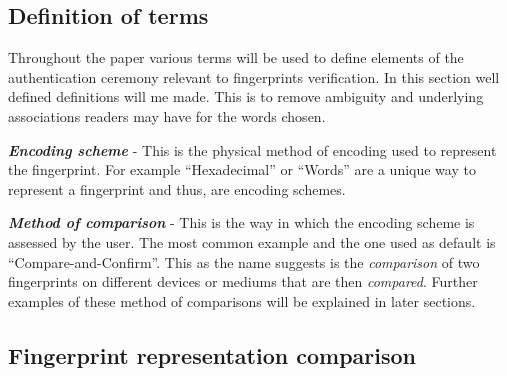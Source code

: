 \subsection*{Definition of terms}
Throughout the paper various terms will be used to define elements of the authentication ceremony relevant to fingerprints verification. In this section well defined definitions will me made. This is to remove ambiguity and underlying associations readers may have for the words chosen.

\textbf{\textit{Encoding scheme}} - This is the physical method of encoding used to represent the fingerprint. For example ``Hexadecimal'' or ``Words'' are a unique way to represent a fingerprint and thus, are encoding schemes.

\textbf{\textit{Method of comparison}} - This is the way in which the encoding scheme is assessed by the user. The most common example and the one used as default is ``Compare-and-Confirm''. This as the name suggests is the \textit{comparison} of two fingerprints on different devices or mediums that are then \textit{compared}. Further examples of these method of comparisons will be explained in later sections.

\subsection{Fingerprint representation comparison}

